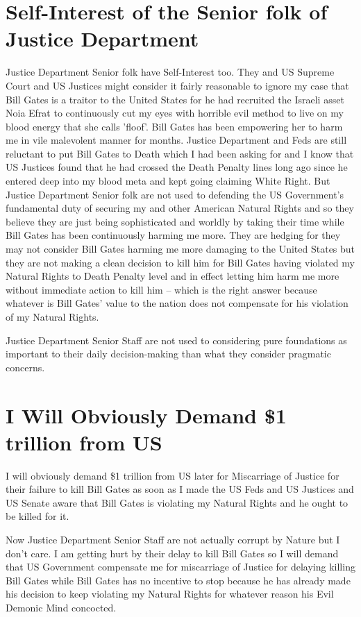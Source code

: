 \documentclass{amsart}
\begin{document}
\section{Self-Interest of the Senior folk of Justice Department}

Justice Department Senior folk have Self-Interest too.  They and US Supreme Court and US Justices might consider it fairly reasonable to ignore my case that Bill Gates is a traitor to the United States for he had recruited the Israeli asset Noia Efrat to continuously cut my eyes with horrible evil method to live on my blood energy that she calls 'floof'. Bill Gates has been empowering her to harm me in vile malevolent manner for months.  Justice Department and Feds are still reluctant to put Bill Gates to Death which I had been asking for and I know that US Justices found that he had crossed the Death Penalty lines long ago since he entered deep into my blood meta and kept going claiming White Right.  But Justice Department Senior folk are not used to defending the US Government's fundamental duty of securing my and other American Natural Rights and so they believe they are just being sophisticated and worldly by taking their time while Bill Gates has been continuously harming me more.  They are hedging for they may not consider Bill Gates harming me more damaging to the United States but they are not making a clean decision to kill him for Bill Gates having violated my Natural Rights to Death Penalty level and in effect letting him harm me more without immediate action to kill him -- which is the right answer because whatever is Bill Gates' value to the nation does not compensate for his violation of my Natural Rights.  

Justice Department Senior Staff are not used to considering pure foundations as important to their daily decision-making than what they consider pragmatic concerns.  

\section{I Will Obviously Demand \$1 trillion from US}

I will obviously demand \$1 trillion from US later for Miscarriage of Justice for their failure to kill Bill Gates as soon as I made the US Feds and US Justices and US Senate aware that Bill Gates is violating my Natural Rights and he ought to be killed for it.

Now Justice Department Senior Staff are not actually corrupt by Nature but I don't care.  I am getting hurt by their delay to kill Bill Gates so I will demand that US Government compensate me for miscarriage of Justice for delaying killing Bill Gates while Bill Gates has no incentive to stop because he has already made his decision to keep violating my Natural Rights for whatever reason his Evil Demonic Mind concocted.  
\end{document}
